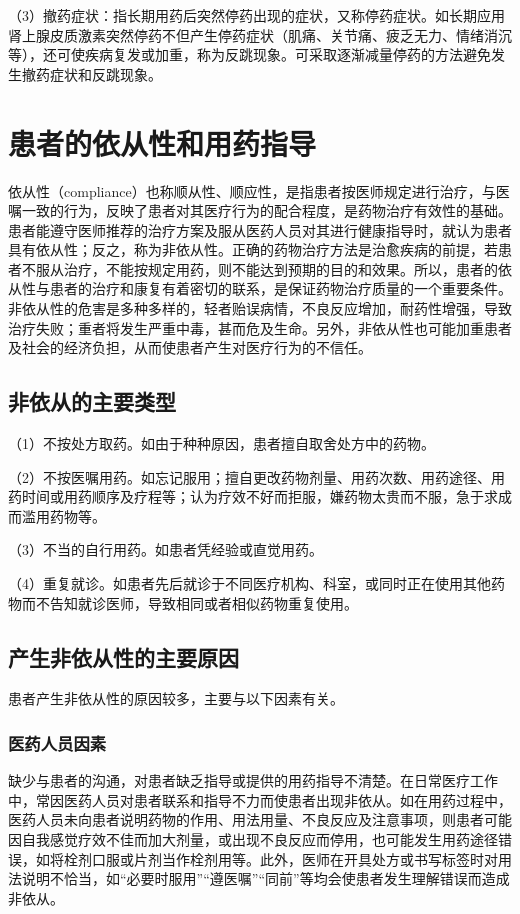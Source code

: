 （3）撤药症状：指长期用药后突然停药出现的症状，又称停药症状。如长期应用肾上腺皮质激素突然停药不但产生停药症状（肌痛、关节痛、疲乏无力、情绪消沉等），还可使疾病复发或加重，称为反跳现象。可采取逐渐减量停药的方法避免发生撤药症状和反跳现象。

\section{患者的依从性和用药指导}

依从性（compliance）也称顺从性、顺应性，是指患者按医师规定进行治疗，与医嘱一致的行为，反映了患者对其医疗行为的配合程度，是药物治疗有效性的基础。患者能遵守医师推荐的治疗方案及服从医药人员对其进行健康指导时，就认为患者具有依从性；反之，称为非依从性。正确的药物治疗方法是治愈疾病的前提，若患者不服从治疗，不能按规定用药，则不能达到预期的目的和效果。所以，患者的依从性与患者的治疗和康复有着密切的联系，是保证药物治疗质量的一个重要条件。非依从性的危害是多种多样的，轻者贻误病情，不良反应增加，耐药性增强，导致治疗失败；重者将发生严重中毒，甚而危及生命。另外，非依从性也可能加重患者及社会的经济负担，从而使患者产生对医疗行为的不信任。

\subsection{非依从的主要类型}

（1）不按处方取药。如由于种种原因，患者擅自取舍处方中的药物。

（2）不按医嘱用药。如忘记服用；擅自更改药物剂量、用药次数、用药途径、用药时间或用药顺序及疗程等；认为疗效不好而拒服，嫌药物太贵而不服，急于求成而滥用药物等。

（3）不当的自行用药。如患者凭经验或直觉用药。

（4）重复就诊。如患者先后就诊于不同医疗机构、科室，或同时正在使用其他药物而不告知就诊医师，导致相同或者相似药物重复使用。

\subsection{产生非依从性的主要原因}

患者产生非依从性的原因较多，主要与以下因素有关。

\subsubsection{医药人员因素}

缺少与患者的沟通，对患者缺乏指导或提供的用药指导不清楚。在日常医疗工作中，常因医药人员对患者联系和指导不力而使患者出现非依从。如在用药过程中，医药人员未向患者说明药物的作用、用法用量、不良反应及注意事项，则患者可能因自我感觉疗效不佳而加大剂量，或出现不良反应而停用，也可能发生用药途径错误，如将栓剂口服或片剂当作栓剂用等。此外，医师在开具处方或书写标签时对用法说明不恰当，如“必要时服用”“遵医嘱”“同前”等均会使患者发生理解错误而造成非依从。

